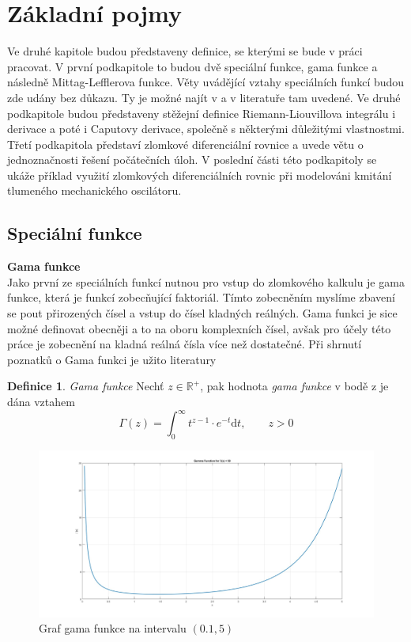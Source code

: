 \documentclass[a4paper,12pt,twoside]{article}
\theoremstyle{definition}
\newtheorem{defin}[veta]{Definice}
\theoremstyle{remark}
\numberwithin{equation}{section}
\numberwithin{table}{section}
\numberwithin{figure}{section}
\newcommand{\dx}[1]{\mathrm{d} #1}
\newcommand{\R}{\mathbb{R}}
\begin{document}
\section{Základní pojmy}
Ve druhé kapitole budou představeny definice, se kterými se bude v práci pracovat. V první podkapitole to budou dvě speciální funkce, gama funkce a následně Mittag-Lefflerova funkce. Věty uvádějící vztahy speciálních funkcí budou zde udány bez důkazu. Ty je možné najít v \cite{Podlubny} a v literatuře tam uvedené.
Ve druhé podkapitole budou představeny stěžejní definice Riemann-Liouvillova integrálu i derivace a poté i Caputovy derivace, společně s některými důležitými vlastnostmi.
Třetí podkapitola představí zlomkové diferenciální rovnice a uvede větu o jednoznačnosti řešení počátečních úloh. V poslední části této podkapitoly se ukáže příklad využití zlomkových diferenciálních rovnic při modelováni kmitání tlumeného mechanického oscilátoru.
\subsection{Speciální funkce}
\textbf{Gama funkce} \\
Jako první ze speciálních funkcí nutnou pro vstup do zlomkového kalkulu je gama funkce, která je funkcí zobecňující faktoriál. Tímto zobecněním myslíme zbavení se pout přirozených čísel a vstup do čísel kladných reálných. Gama funkci je sice možné definovat obecněji a to na oboru komplexních čísel, avšak pro účely této práce je zobecnění na kladná reálná čísla více než dostatečné.
Při shrnutí poznatků o Gama funkci je užito literatury \cite{Bashour}
 
\begin{defin}{\emph{Gama funkce}} \label{GammaFunkce}
	Nechť $z \in \R ^{+}$, pak hodnota \emph{gama funkce} v bodě z je dána vztahem
	$$
	\Gamma \left( z\right)  = \int_{0}^{ \infty } t^{z-1} \cdot e^{-t} \dx{t}, \qquad   z > 0
	$$
\end{defin}


\begin{figure} [h!] 
	\caption{Graf gama funkce na  intervalu $\left(0.1, 5\right)$}
	\label{GrafGamma}
	\includegraphics[width=1\textwidth]{Gamma+.jpg}
\end{figure}
\end{document}
